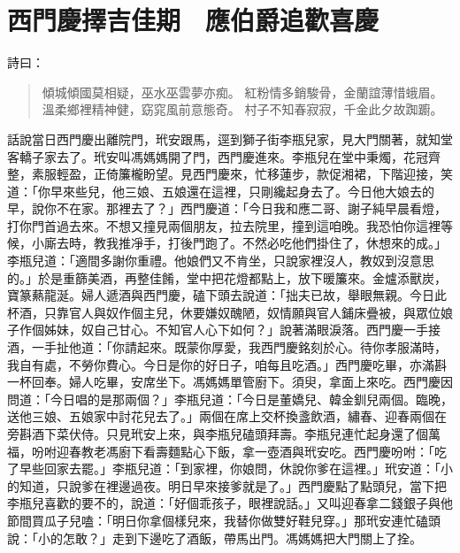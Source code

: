 
\chapter{西門慶擇吉佳期　應伯爵追歡喜慶}

詩曰：
\begin{quote}
傾城傾國莫相疑，巫水巫雲夢亦痴。
紅粉情多銷駿骨，金蘭誼薄惜蛾眉。
溫柔鄉裡精神健，窈窕風前意態奇。
村子不知春寂寂，千金此夕故踟躕。
\end{quote}

話說當日西門慶出離院門，玳安跟馬，逕到獅子街李瓶兒家，見大門關著，就知堂客轎子家去了。玳安叫馮媽媽開了門，西門慶進來。李瓶兒在堂中秉燭，花冠齊整，素服輕盈，正倚簾櫳盼望。見西門慶來，忙移蓮步，款促湘裙，下階迎接，笑道：「你早來些兒，他三娘、五娘還在這裡，只剛纔起身去了。今日他大娘去的早，說你不在家。那裡去了？」西門慶道：「今日我和應二哥、謝子純早晨看燈，打你門首過去來。不想又撞見兩個朋友，拉去院里，撞到這咱晚。我恐怕你這裡等候，小廝去時，教我推凈手，打後門跑了。不然必吃他們掛住了，休想來的成。」李瓶兒道：「適間多謝你重禮。他娘們又不肯坐，只說家裡沒人，教奴到沒意思的。」於是重篩美酒，再整佳餚，堂中把花燈都點上，放下暖簾來。金爐添獸炭，寶篆爇龍涎。婦人遞酒與西門慶，磕下頭去說道：「拙夫已故，舉眼無親。今日此杯酒，只靠官人與奴作個主兒，休要嫌奴醜陋，奴情願與官人鋪床疊被，與眾位娘子作個姊妹，奴自己甘心。不知官人心下如何？」說著滿眼淚落。西門慶一手接酒，一手扯他道：「你請起來。既蒙你厚愛，我西門慶銘刻於心。待你孝服滿時，我自有處，不勞你費心。今日是你的好日子，咱每且吃酒。」西門慶吃畢，亦滿斟一杯回奉。婦人吃畢，安席坐下。馮媽媽單管廚下。須臾，拿面上來吃。西門慶因問道：「今日唱的是那兩個？」李瓶兒道：「今日是董嬌兒、韓金釧兒兩個。臨晚，送他三娘、五娘家中討花兒去了。」兩個在席上交杯換盞飲酒，繡春、迎春兩個在旁斟酒下菜伏侍。只見玳安上來，與李瓶兒磕頭拜壽。李瓶兒連忙起身還了個萬福，吩咐迎春教老馮廚下看壽麵點心下飯，拿一壺酒與玳安吃。西門慶吩咐：「吃了早些回家去罷。」李瓶兒道：「到家裡，你娘問，休說你爹在這裡。」玳安道：「小的知道，只說爹在裡邊過夜。明日早來接爹就是了。」西門慶點了點頭兒，當下把李瓶兒喜歡的要不的，說道：「好個乖孩子，眼裡說話。」又叫迎春拿二錢銀子與他節間買瓜子兒嗑：「明日你拿個樣兒來，我替你做雙好鞋兒穿。」那玳安連忙磕頭說：「小的怎敢？」走到下邊吃了酒飯，帶馬出門。馮媽媽把大門關上了拴。

